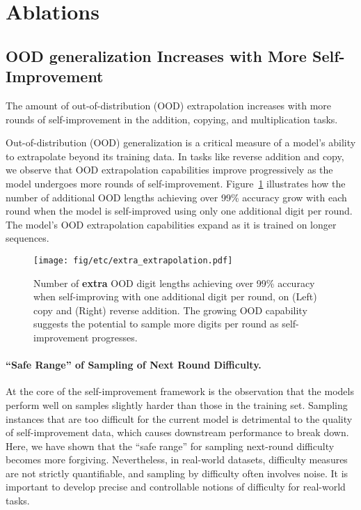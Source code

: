 \section{Ablations}
\subsection{OOD generalization Increases with More Self-Improvement}\label{sec:ood_increases}

\begin{finding}
    The amount of out-of-distribution (OOD) extrapolation increases with more rounds of self-improvement in the addition, copying, and multiplication tasks.
\end{finding}


Out-of-distribution (OOD) generalization is a critical measure of a model's ability to extrapolate beyond its training data. In tasks like reverse addition and copy, we observe that OOD extrapolation capabilities improve progressively as the model undergoes more rounds of self-improvement. Figure~\ref{fig:acc_ood_digits} illustrates how the number of additional OOD lengths achieving over 99\% accuracy grow with each round when the model is self-improved using only one additional digit per round. The model's OOD extrapolation capabilities expand as it is trained on longer sequences. 

\begin{figure}
    \centering
    \texttt{[image: fig/etc/extra\_extrapolation.pdf]}
    \caption{Number of \textbf{extra} OOD digit lengths achieving over 99\% accuracy when self-improving with one additional digit per round, on (Left) copy and (Right) reverse addition. The growing OOD capability suggests the potential to sample more digits per round as self-improvement progresses.}
    \label{fig:acc_ood_digits}
\end{figure}





\paragraph{``Safe Range'' of Sampling of Next Round Difficulty. } 
At the core of the self-improvement framework is the observation that the models perform well on samples slightly harder than those in the training set. Sampling instances that are too difficult for the current model is detrimental to the quality of self-improvement data, which causes downstream performance to break down. Here, we have shown that the ``safe range'' for sampling next-round difficulty becomes more forgiving.  Nevertheless, in real-world datasets, difficulty measures are not strictly quantifiable, and sampling by difficulty often involves noise. It is important to develop precise and controllable notions of difficulty for real-world tasks. 



